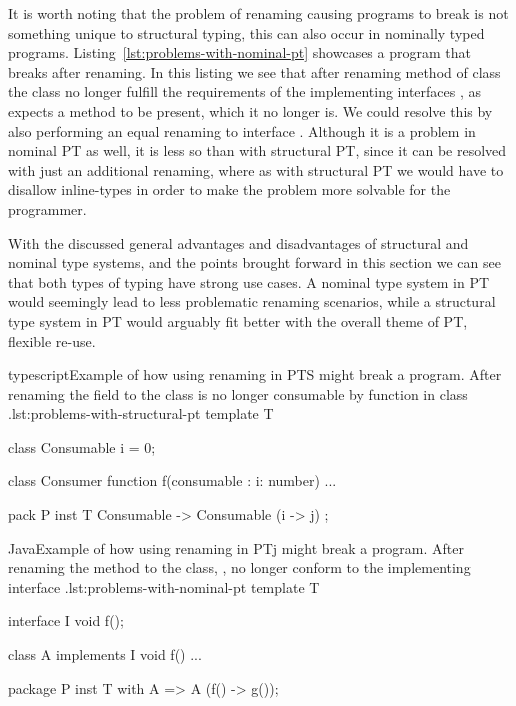 It is worth noting that the problem of renaming causing programs to break is not something unique to structural typing, this can also occur in nominally typed programs.
Listing~\vref{lst:problems-with-nominal-pt} showcases a program that breaks after renaming.
In this listing we see that after renaming method  of class  the class no longer fulfill the requirements of the implementing interfaces , as  expects a method  to be present, which it no longer is.
We could resolve this by also performing an equal renaming to interface .
Although it is a problem in nominal PT as well, it is less so than with structural PT, since it can be resolved with just an additional renaming, where as with structural PT we would have to disallow inline-types in order to make the problem more solvable for the programmer.

With the discussed general advantages and disadvantages of structural and nominal type systems, and the points brought forward in this section we can see that both types of typing have strong use cases.
A nominal type system in PT would seemingly lead to less problematic renaming scenarios, while a structural type system in PT would arguably fit better with the overall theme of PT, flexible re-use.


\begin{code}{typescript}{Example of how using renaming in PTS might break a program. After renaming the field  to  the class  is no longer consumable by function  in class .}{lst:problems-with-structural-pt}
    template T {
        class Consumable {
            i = 0;
        }

        class Consumer {
            function f(consumable : {i: number}) {
                ...
            }
        }
    }

    pack P {
        inst T { Consumable -> Consumable (i -> j) };
    }
\end{code}

\begin{code}{Java}{Example of how using renaming in PTj might break a program. After renaming the method  to  the class, , no longer conform to the implementing interface .}{lst:problems-with-nominal-pt}
    template T {
        interface I {
            void f();
        }

        class A implements I {
            void f() { ... }
        }
    }

    package P {
        inst T with A => A (f() -> g());
    }
\end{code}

